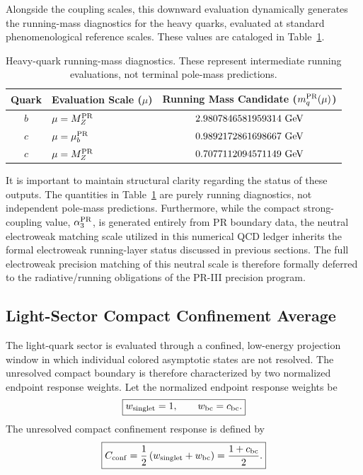 \documentclass[11pt]{article}
\renewcommand{\arraystretch}{1.22}
\renewcommand{\arraystretch}{1.4}
\begin{document}
Alongside the coupling scales, this downward evaluation dynamically generates the running-mass diagnostics for the heavy quarks, evaluated at standard phenomenological reference scales. These values are cataloged in Table~\ref{tab:pr2_qcd_running_diagnostics}.

\begin{table}[ht!]
\centering
\caption{Heavy-quark running-mass diagnostics. These represent intermediate running evaluations, not terminal pole-mass predictions.}
\label{tab:pr2_qcd_running_diagnostics}
\small
\renewcommand{\arraystretch}{1.25}
\begin{tabular}{clc}
\hline\hline
\textbf{Quark} & \textbf{Evaluation Scale (\(\mu\))} & \textbf{Running Mass Candidate (\(m_q^{\rm PR}(\mu)\))} \\ \hline
\(b\) & \(\mu = M_Z^{\rm PR}\)  & \(2.9807846581959314\ {\rm GeV}\) \\
\(c\) & \(\mu = \mu_b^{\rm PR}\) & \(0.9892172861698667\ {\rm GeV}\) \\
\(c\) & \(\mu = M_Z^{\rm PR}\) & \(0.7077112094571149\ {\rm GeV}\) \\ \hline\hline
\end{tabular}
\end{table}

It is important to maintain structural clarity regarding the status of these outputs. The quantities in Table~\ref{tab:pr2_qcd_running_diagnostics} are purely running diagnostics, not independent pole-mass predictions. Furthermore, while the compact strong-coupling value, \(\alpha_3^{\rm PR}\), is generated entirely from PR boundary data, the neutral electroweak matching scale utilized in this numerical QCD ledger inherits the formal electroweak running-layer status discussed in previous sections. The full electroweak precision matching of this neutral scale is therefore formally deferred to the radiative/running obligations of the PR-III precision program.

\subsection{Light-Sector Compact Confinement Average}
\label{sec:pr2_light_sector_confinement_average_main}

The light-quark sector is evaluated through a confined, low-energy projection window in which individual colored asymptotic states are not resolved. The unresolved compact boundary is therefore characterized by
two normalized endpoint response weights. Let the normalized endpoint response weights be
\begin{equation}
\boxed{
w_{\rm singlet}=1,
\qquad
w_{\rm bc}=c_{\rm bc}.
}
\end{equation}
The unresolved compact confinement response is defined by
\begin{equation}
\boxed{
C_{\rm conf}
=
\frac12
\left(
w_{\rm singlet}+w_{\rm bc}
\right)
=
\frac{1+c_{\rm bc}}{2}.
}
\end{equation}
\end{document}
